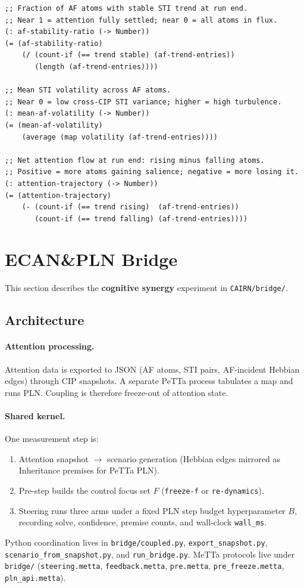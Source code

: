 \documentclass[11pt]{article}
\theoremstyle{definition}
\begin{document}
\begin{lstlisting}[style=metta, caption=Derived Attention Trend Metrics]
;; Fraction of AF atoms with stable STI trend at run end.
;; Near 1 = attention fully settled; near 0 = all atoms in flux.
(: af-stability-ratio (-> Number))
(= (af-stability-ratio)
    (/ (count-if (== trend stable) (af-trend-entries))
       (length (af-trend-entries))))

;; Mean STI volatility across AF atoms.
;; Near 0 = low cross-CIP STI variance; higher = high turbulence.
(: mean-af-volatility (-> Number))
(= (mean-af-volatility)
    (average (map volatility (af-trend-entries))))

;; Net attention flow at run end: rising minus falling atoms.
;; Positive = more atoms gaining salience; negative = more losing it.
(: attention-trajectory (-> Number))
(= (attention-trajectory)
    (- (count-if (== trend rising)  (af-trend-entries))
       (count-if (== trend falling) (af-trend-entries))))
\end{lstlisting}

\section{ECAN\&PLN Bridge}\label{sec:cognitive-synergy}

This section describes the \textbf{cognitive synergy} experiment in \texttt{CAIRN/bridge/}.

\subsection{Architecture}

\paragraph{Attention processing.}
Attention data is exported to JSON (AF atoms, STI pairs, AF-incident Hebbian edges) through CIP snapshots. A separate PeTTa process tabulates a map and runs PLN. Coupling is therefore freeze-out of attention state.

\paragraph{Shared kernel.}
One measurement step is:
\begin{enumerate}
    \item Attention snapshot $\rightarrow$ scenario generation (Hebbian edges mirrored as Inheritance premises for PeTTa PLN).
    \item Pre-step builds the control focus set $F$ (\texttt{freeze-f} or \texttt{re-dynamics}).
    \item Steering runs three arms under a fixed PLN step budget hyperparameter $B$, recording solve, confidence, premise counts, and wall-clock \texttt{wall\_ms}.
\end{enumerate}
Python coordination lives in \texttt{bridge/coupled.py}, \texttt{export\_snapshot.py}, \texttt{scenario\_from\_snapshot.py}, and \texttt{run\_bridge.py}. MeTTa protocols live under \texttt{bridge/} (\texttt{steering.metta}, \texttt{feedback.metta}, \texttt{pre.metta}, \texttt{pre\_freeze.metta}, \texttt{pln\_api.metta}).
\end{document}

